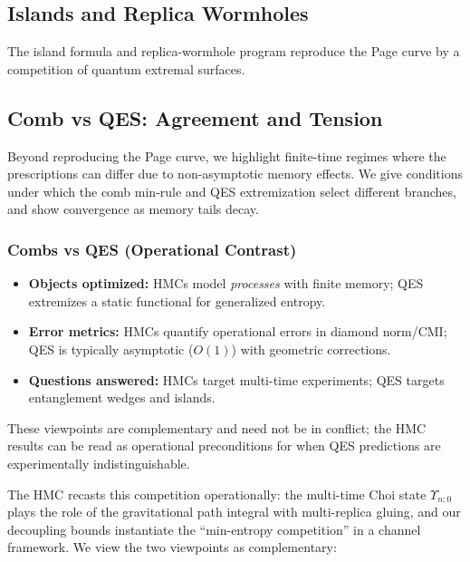 \documentclass[11pt,a4paper]{article}
\newcommand{\HMC}{\textsc{HMC}\xspace}
\theoremstyle{plain}
\theoremstyle{definition}
\theoremstyle{remark}
\begin{document}
\subsection{Islands and Replica Wormholes}
The island formula and replica-wormhole program \cite{Penington:2020,Almheiri:2020,Chen:2020}
reproduce the Page curve by a competition of quantum extremal surfaces.

\subsection{Comb vs QES: Agreement and Tension}
Beyond reproducing the Page curve, we highlight finite-time regimes where the prescriptions can differ due to non-asymptotic memory effects. We give conditions under which the comb min-rule and QES extremization select different branches, and show convergence as memory tails decay. 

\subsubsection{Combs vs QES (Operational Contrast)}
\label{app:comb-vs-qes}
\begin{itemize}[leftmargin=*,itemsep=0.25em]
  \item \textbf{Objects optimized:} \HMC{}s model \emph{processes} with finite memory; QES extremizes a static functional for generalized entropy.
  \item \textbf{Error metrics:} \HMC{}s quantify operational errors in diamond norm/CMI; QES is typically asymptotic ($O(1)$) with geometric corrections.
  \item \textbf{Questions answered:} \HMC{}s target multi-time experiments; QES targets entanglement wedges and islands.
\end{itemize}
These viewpoints are complementary and need not be in conflict; the \HMC{} results can be read as operational preconditions for when QES predictions are experimentally indistinguishable.


The \HMC{} recasts this competition operationally:
the multi-time Choi state $\Upsilon_{n{:}0}$ plays the role of the gravitational path integral with multi-replica gluing,
and our decoupling bounds instantiate the ``min-entropy competition'' in a channel framework.
We view the two viewpoints as complementary:
\end{document}
